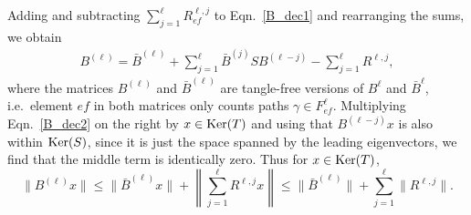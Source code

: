 Adding and subtracting 
$\sum_{j=1}^{\ell} R^{\ell,j}_{ef}$ 
to Eqn.~\eqref{B_dec1}
and rearranging the sums, we obtain
\begin{align}
\label{B_dec2}
B^{(\ell)} = 
\bar{B}^{(\ell)} + 
\sum_{j=1}^{\ell} 
\bar{B}^{(j)} S B^{(\ell-j)}
- 
\sum_{j=1}^{\ell} R^{\ell,j},
\end{align}
where the matrices $B^{(\ell)}$ and $\bar{B}^{(\ell)}$
are tangle-free versions of $B^\ell$ and $\bar{B}^\ell$,
i.e.\ element $ef$ in both matrices
only counts paths $\gamma \in F_{ef}^\ell$.
Multiplying Eqn.~\eqref{B_dec2} on the right by 
$x \in \mathrm{Ker} (T)$
and using that 
$B^{(\ell - j)} x$
is also within $\mathrm{Ker}(S)$,
since it is just the space spanned by the leading eigenvectors,
we find that the middle term is identically zero.
Thus for $x \in \mathrm{Ker}(T)$,
\begin{equation}\label{decomposition}
\| B^{(\ell)}x \| 
\leq 
\| \bar{B}^{(\ell)} x \|+
\left\| 
\sum_{j=1}^{\ell}R^{\ell,j} x 
\right\|
\leq 
\| \bar{B}^{(\ell)} \|+
\sum_{j=1}^{\ell} \| R^{\ell,j} \| .
\end{equation}
